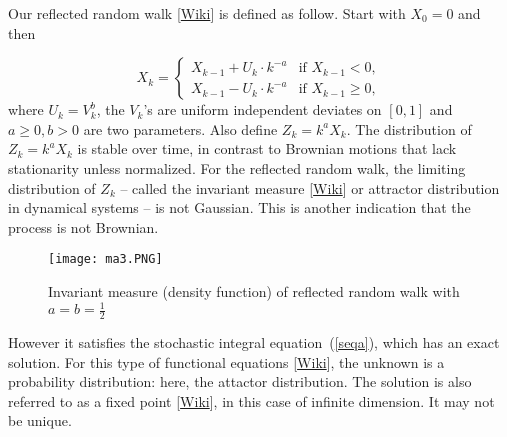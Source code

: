 \documentclass[oneside,10pt]{book}
\begin{document}
Our \textcolor{index}{reflected random walk} [\href{https://en.wikipedia.org/wiki/Reflected_Brownian_motion}{Wiki}] is defined as follow. Start with $X_0=0$ and then

\begin{equation}
X_k = \begin{cases}X_{k-1} + U_k\cdot k^{-a} & \text{if } X_{k-1} < 0, \\
                      X_{k-1} - U_k\cdot k^{-a}                                   & \text{if }   X_{k-1} \geq 0,%
        \end{cases}\label{poputres}
\end{equation}
where $U_k = V^b_k$, the $V_k$'s are uniform independent deviates on $[0, 1]$ and $a\geq 0, b>0$ are two parameters.
Also define $Z_k=k^a X_k$.
The distribution of $Z_k = k^a X_k$ is stable over time, in contrast to Brownian motions that lack stationarity unless normalized. For the reflected random walk, the limiting distribution of $Z_k$ -- called the \textcolor{index}{invariant measure} [\href{https://en.wikipedia.org/wiki/Invariant_measure}{Wiki}] 
 or \textcolor{index}{attractor distribution} in dynamical systems -- is not Gaussian. This is another indication that the process is not Brownian. 

\begin{figure}[H]
\centering
\texttt{[image: ma3.PNG]} %
\caption{Invariant measure (density function) of reflected random walk with $a=b=\frac{1}{2}$}
\label{fig:iv}
\end{figure}

However it satisfies
 the \textcolor{index}{stochastic integral equation}~(\ref{seqa}), which has an exact solution. For this type of
 \textcolor{index}{functional equations} [\href{https://en.wikipedia.org/wiki/Functional_equation}{Wiki}], the unknown is a probability distribution: here, the attactor distribution. The solution is also referred to as a 
\textcolor{index}{fixed point} [\href{https://en.wikipedia.org/wiki/Fixed_point_(mathematics)}{Wiki}], in this case of infinite dimension. It may not be unique.
\end{document}
